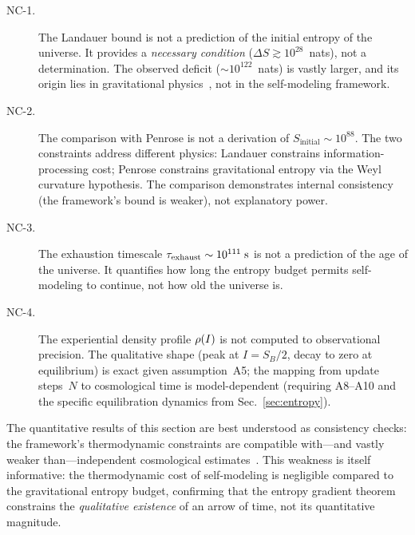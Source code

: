\begin{description}
  \item[NC-1.] The Landauer bound is not a prediction of the initial
    entropy of the universe.  It provides a \emph{necessary
    condition} ($\Delta S \gtrsim 10^{28}$~nats), not a
    determination.  The observed deficit ($\sim\!10^{122}$~nats) is
    vastly larger, and its origin lies in gravitational
    physics~\cite{Penrose1979}, not in the self-modeling framework.

  \item[NC-2.] The comparison with Penrose is not a derivation of
    $S_{\mathrm{initial}} \sim 10^{88}$.  The two constraints
    address different physics: Landauer constrains
    information-processing cost; Penrose constrains gravitational
    entropy via the Weyl curvature hypothesis.  The comparison
    demonstrates internal consistency (the framework's bound is
    weaker), not explanatory power.

  \item[NC-3.] The exhaustion timescale $\tau_{\mathrm{exhaust}} \sim 10^{111}\;\text{s}$
    is not a prediction of the age of the universe.  It quantifies how
    long the entropy budget permits self-modeling to continue, not how
    old the universe is.

  \item[NC-4.] The experiential density profile $\rho(I)$ is not
    computed to observational precision.  The qualitative shape (peak
    at $I = S_B/2$, decay to zero at equilibrium) is exact given
    assumption~A5; the mapping from update steps~$N$ to cosmological
    time is model-dependent (requiring A8--A10 and the specific
    equilibration dynamics from Sec.~\ref{sec:entropy}).
\end{description}

\medskip
The quantitative results of this section are best understood as
consistency checks: the framework's thermodynamic constraints are
compatible with---and vastly weaker than---independent cosmological
estimates~\cite{Penrose1979,Albert2000}.  This weakness is itself
informative: the thermodynamic cost of self-modeling is negligible
compared to the gravitational entropy budget, confirming that the
entropy gradient theorem constrains the \emph{qualitative existence}
of an arrow of time, not its quantitative magnitude.

